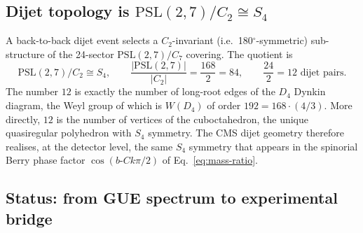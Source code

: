 \documentclass[11pt,a4paper]{article}
\newcommand{\bC}{b\text{-}C}
\newcommand{\PSL}{\mathrm{PSL}}
\theoremstyle{plain}
\theoremstyle{definition}
\theoremstyle{remark}
\begin{document}
\subsection{Dijet topology is $\PSL(2,7)/C_2 \cong S_4$}
\label{sec:dijet-topology}

A back-to-back dijet event selects a $C_2$-invariant (i.e.\
180$^\circ$-symmetric) sub-structure of the 24-sector
$\PSL(2,7)/C_7$ covering.  The quotient is
\[
\PSL(2,7)/C_2 \cong S_4,
\qquad
\frac{|\PSL(2,7)|}{|C_2|} = \frac{168}{2} = 84,
\qquad
\frac{24}{2} = 12 \text{ dijet pairs}.
\]
The number $12$ is exactly the number of long-root edges of the
$D_4$ Dynkin diagram, the Weyl group of which is $W(D_4)$ of order
$192 = 168 \cdot (4/3)$.  More directly, $12$ is the number of
vertices of the cuboctahedron, the unique quasiregular polyhedron with
$S_4$ symmetry.  The CMS dijet geometry therefore realises, at the
detector level, the same $S_4$ symmetry that appears in the
spinorial Berry phase factor $\cos(\bC k \pi/2)$ of
Eq.~\eqref{eq:mass-ratio}.

\subsection{Status: from GUE spectrum to experimental bridge}
\label{sec:bridge-status}
\end{document}
